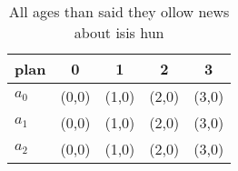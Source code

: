 \documentclass[a4paper]{article}
\begin{document}
\begin{table}
\begin{adjustbox}{width=0.5\columnwidth}
\begin{tabular}{|l|l|l|l|l|}
\hline
\textbf{plan} & \multicolumn{1}{c|}{\textbf{0}} & \multicolumn{1}{c|}{\textbf{1}} & \multicolumn{1}{c|}{\textbf{2}} & \multicolumn{1}{c|}{\textbf{3}} \\ \hline
\textbf{$a_0$}  & (0,0) & (1,0) & (2,0) & (3,0) \\ \hline
\textbf{$a_1$}  & (0,0) & (1,0) & (2,0) & (3,0) \\ \hline
\textbf{$a_2$}  & (0,0) & (1,0) & (2,0) & (3,0) \\ \hline
\end{tabular}
\end{adjustbox}
\caption{All ages than said they ollow news about isis hun
}
\end{table}
\end{document}
